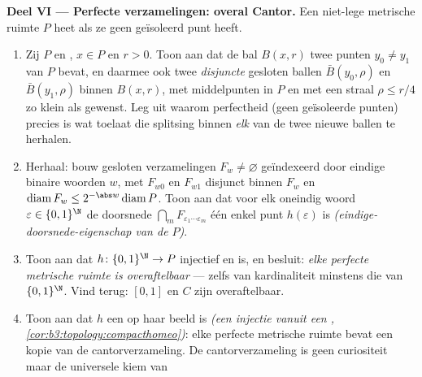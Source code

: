 \begin{problem}
\medskip
\noindent\textbf{Deel VI --- Perfecte  verzamelingen:
overal Cantor.} Een niet-lege  metrische ruimte $P$ heet
\emph{} als ze geen geïsoleerd punt heeft.
\begin{enumerate}[resume]
  \item Zij $P$  en , $x \in P$ en $r > 0$. Toon aan
        dat de bal $B(x, r)$ twee punten $y_0 \neq y_1$ van $P$
        bevat, en daarmee ook twee \emph{disjuncte} gesloten
        ballen $\bar B(y_0, \rho)$ en $\bar B(y_1, \rho)$ binnen
        $B(x, r)$, met middelpunten in $P$ en met een straal $\rho
        \leq r/4$ zo klein als gewenst. Leg uit waarom
        perfectheid (geen geïsoleerde punten) precies is wat
        toelaat die splitsing binnen \emph{elk} van de twee nieuwe
        ballen te herhalen.
  \item Herhaal: bouw gesloten verzamelingen $F_w \neq
        \varnothing$ geïndexeerd door eindige binaire woorden $w$,
        met $F_{w0}$ en $F_{w1}$ disjunct binnen $F_w$ en
        $\operatorname{diam}F_w \leq 2^{-\abs w}
        \operatorname{diam}P$. Toon aan dat voor elk oneindig
        woord $\varepsilon \in \{0,1\}^\N$ de doorsnede
        $\bigcap_mF_{\varepsilon_1\cdots\varepsilon_m}$ één enkel
        punt $h(\varepsilon)$ is
        \emph{(eindige-doorsnede-eigenschap van de 
        $P$)}.
  \item Toon aan dat $h\colon\{0,1\}^\N \to P$ injectief en
         is, en besluit: \emph{elke perfecte 
        metrische ruimte is overaftelbaar} --- zelfs van
        kardinaliteit minstens die van $\{0,1\}^\N$. Vind terug:
        $[0,1]$ en $C$ zijn overaftelbaar.
  \item Toon aan dat $h$ een  op haar beeld is
        \emph{(een  injectie vanuit een ,
        \cref{cor:b3:topology:compacthomeo})}: elke perfecte
         metrische ruimte bevat een  kopie van
        de cantorverzameling. De cantorverzameling is geen
        curiositeit maar de universele kiem van 

\end{enumerate}
\end{problem}
